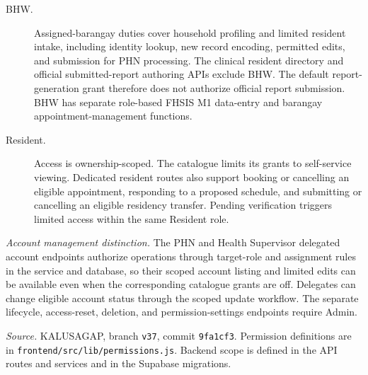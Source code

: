 \begin{description}
\item[BHW.] Assigned-barangay duties cover household profiling and limited resident intake, including identity lookup, new record encoding, permitted edits, and submission for PHN processing. The clinical resident directory and official submitted-report authoring APIs exclude BHW. The default report-generation grant therefore does not authorize official report submission. BHW has separate role-based FHSIS M1 data-entry and barangay appointment-management functions.
\item[Resident.] Access is ownership-scoped. The catalogue limits its grants to self-service viewing. Dedicated resident routes also support booking or cancelling an eligible appointment, responding to a proposed schedule, and submitting or cancelling an eligible residency transfer. Pending verification triggers limited access within the same Resident role.
\end{description}

\noindent\textit{Account management distinction.} The PHN and Health Supervisor delegated account endpoints authorize operations through target-role and assignment rules in the service and database, so their scoped account listing and limited edits can be available even when the corresponding catalogue grants are off. Delegates can change eligible account status through the scoped update workflow. The separate lifecycle, access-reset, deletion, and permission-settings endpoints require Admin.

\par\medskip
\noindent\textit{Source.} KALUSAGAP, branch \texttt{v37}, commit \texttt{9fa1cf3}. Permission definitions are in \texttt{frontend/src/lib/permissions.js}. Backend scope is defined in the API routes and services and in the Supabase migrations.
\par
\endgroup
